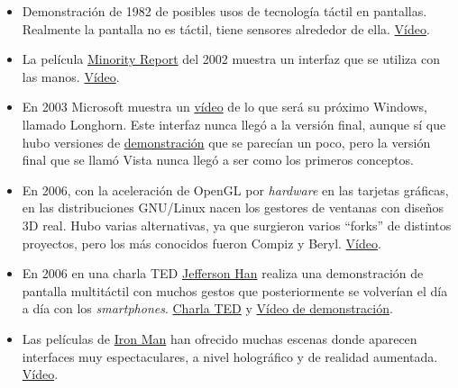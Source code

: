 \begin{itemize}

    \item Demonstración de 1982 de posibles usos de tecnología táctil en pantallas. Realmente la pantalla no es táctil, tiene sensores alrededor de ella. \href{https://www.youtube.com/watch?v=JAcZpQCLb4E}{Vídeo}.

    \item La película \href{https://www.imdb.com/title/tt0181689/}{Minority Report} del 2002 muestra un interfaz que se utiliza con las manos. \href{https://www.youtube.com/watch?v=33Raqx9sFbo}{Vídeo}.

    \item En 2003 Microsoft muestra un \href{https://www.youtube.com/watch?v=b9ifQvQCO7Y}{vídeo} de lo que será su próximo Windows, llamado Longhorn. Este interfaz nunca llegó a la versión final, aunque sí que hubo versiones de \href{https://www.youtube.com/watch?v=pjExyeyLBG0}{demonstración} que se parecían un poco, pero la versión final que se llamó Vista nunca llegó a ser como los primeros conceptos.

    \item En 2006, con la aceleración de OpenGL por \textit{hardware} en las tarjetas gráficas, en las distribuciones GNU/Linux nacen los gestores de ventanas con diseños 3D real. Hubo varias alternativas, ya que surgieron varios “forks” de distintos proyectos, pero los más conocidos fueron Compiz y Beryl. \href{https://www.youtube.com/watch?v=4QokOwvPxrE}{Vídeo}.

    \item En 2006 en una charla TED \href{https://en.wikipedia.org/wiki/Jefferson_Han}{Jefferson Han} realiza una demonstración de pantalla multitáctil con muchos gestos que posteriormente se volverían el día a día con los \textit{smartphones}. \href{https://www.youtube.com/watch?v=QKh1Rv0PlOQ}{Charla TED} y \href{https://www.youtube.com/watch?v=wHfKrk8QMM0}{Vídeo de demonstración}.

    \item Las películas de \href{https://www.youtube.com/watch?v=P5k-4-OEuTk}{Iron Man} han ofrecido muchas escenas donde aparecen interfaces muy espectaculares, a nivel holográfico y de realidad aumentada. \href{https://www.youtube.com/watch?v=P5k-4-OEuTk}{Vídeo}.
\end{itemize}